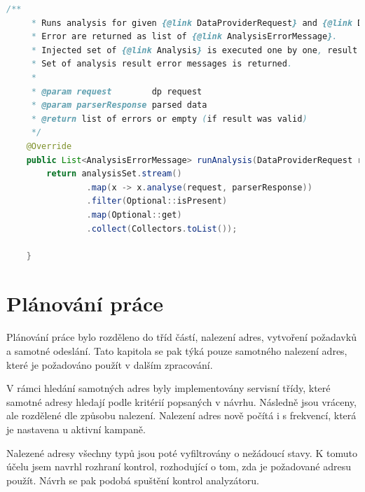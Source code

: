 \documentclass[thesis=B,czech]{FITthesis}[2012/06/26]
\begin{document}
\par
\begin{lstlisting}[language=Java, caption={Upravená implementace hlavní metody ve třídě zajišťující spouštění validací analyzátoru}]
    /**
     * Runs analysis for given {@link DataProviderRequest} and {@link DPParserResponse}.
     * Error are returned as list of {@link AnalysisErrorMessage}.
     * Injected set of {@link Analysis} is executed one by one, result unwrapped and kept if present.
     * Set of analysis result error messages is returned.
     *
     * @param request        dp request
     * @param parserResponse parsed data
     * @return list of errors or empty (if result was valid)
     */
    @Override
    public List<AnalysisErrorMessage> runAnalysis(DataProviderRequest request, DPParserResponse parserResponse) {
        return analysisSet.stream()
                .map(x -> x.analyse(request, parserResponse))
                .filter(Optional::isPresent)
                .map(Optional::get)
                .collect(Collectors.toList());

    }
\end{lstlisting}


\section{Plánování práce}
Plánování práce bylo rozděleno do tříd částí, nalezení adres, vytvoření požadavků a samotné odeslání.
Tato kapitola se pak týká pouze samotného nalezení adres, které je požadováno použít v dalším zpracování.
\par
V rámci hledání samotných adres byly implementovány servisní třídy, které samotné adresy hledají podle kritérií popsaných v 
návrhu. Následně jsou vráceny, ale rozdělené dle způsobu nalezení. Nalezení adres nově počítá i s frekvencí, 
která je nastavena u aktivní kampaně.
\par
Nalezené adresy všechny typů jsou poté vyfiltrovány o nežádoucí stavy. K tomuto účelu jsem navrhl rozhraní kontrol, rozhodující 
o tom, zda je požadované adresu použít. Návrh se pak podobá spuštění kontrol analyzátoru.
\end{document}
